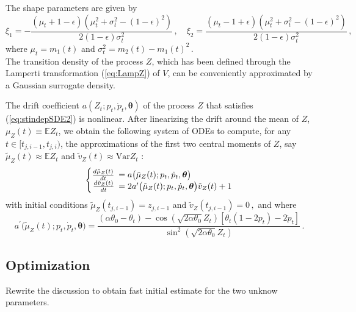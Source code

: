 \documentclass[11pt]{article}
\theoremstyle{definition}
\begin{document}
The shape parameters are given by
\begin{equation}
\xi_1 = - \frac{(\mu_t + 1 - \epsilon)(\mu_t^2 + \sigma_t^2 - (1- \epsilon)^2)}{2 (1 - \epsilon) \sigma_t^2}\,, \quad \xi_2=  \frac{(\mu_t-1 + \epsilon )(\mu_t^2 + \sigma_t^2 - (1- \epsilon)^2)}{2 (1 - \epsilon) \sigma_t^2} \,, \label{param_transformed_beta}
\end{equation}
where $\mu_t = m_1 (t)$ and $\sigma_t^2= m_2 (t)- m_1 (t)^2\,.$ \\

The transition density of the process $Z$, which has been defined through the Lamperti transformation (\ref{eq:LampZ}) of $V$, can be conveniently approximated by a Gaussian surrogate density. 

The drift coefficient $a(Z_t; p_t, \dot{p}_t, \bm{\theta}) $ of the process $Z$ that satisfies (\ref{eq:stindepSDE2}) is nonlinear. After linearizing the drift around the mean of $Z$, $\mu_Z(t) \equiv \mathbb{E}Z_t$,  we obtain the following system of ODEs to compute, for any $t\in [t_{j,i-1}, t_{j, i})$, the approximations of the first two central moments of $Z$, say  $\tilde{\mu}_Z(t) \approx \mathbb{E}Z_t$ and $\tilde{v}_Z(t) \approx \text{Var} Z_t$ :\\
\begin{equation}
  \left\{
  \begin{array}{@{}rl@{}}
    \frac{d \tilde{\mu}_Z (t)}{dt} \!\!\!&=  a\big( \tilde{\mu}_Z (t) ; p_t, \dot{p}_t, \bm{\theta} \big)   \\
    \frac{d \tilde{v}_Z (t)}{dt}  \!\!\!&= 2  a^{\prime} \big( \tilde{\mu}_Z (t) ; p_t, \dot{p}_t, \bm{\theta} \big) \tilde{v}_Z (t) + 1
 \end{array}\right.  \label{Ztmom}
\end{equation}
with initial conditions $\tilde{\mu}_Z(t_{j,i-1})= z_{j, i-1}$ and $\tilde{v}_Z(t_{j,i-1})= 0 \,,$ and where 
\begin{equation*}
a^{\prime} \big( \tilde{\mu}_Z (t) ; p_t, \dot{p}_t, \bm{\theta} \big) =    \frac{  (\alpha \theta_0 - \theta_t)  - \cos(\sqrt{2 \alpha \theta_0 } Z_t) [ \theta_t (1 - 2 p_t) - 2  \dot{p}_t ] }{\sin^2{(\sqrt{2 \alpha \theta_0} Z_t)}} \,.
\end{equation*}

\subsection{Optimization} \label{opt_sec}
{\color{red} Rewrite the discussion to obtain fast initial estimate for the two unknow parameters.}
\end{document}
